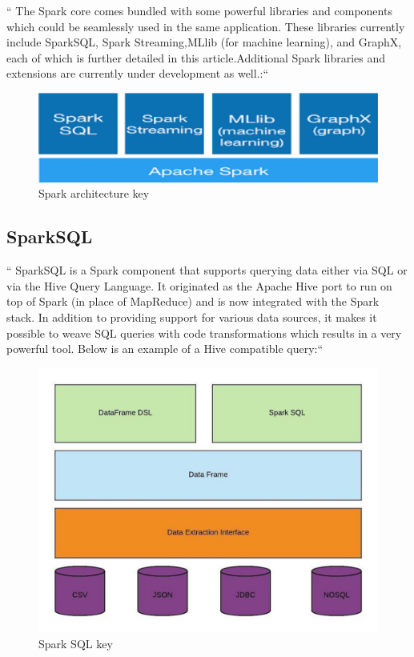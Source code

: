`` The Spark core comes bundled with some powerful libraries and components which could be
seamlessly used in the same application. These libraries currently include SparkSQL,
Spark Streaming,MLlib (for machine learning), and GraphX, each of which is further
detailed in this article.Additional Spark libraries and extensions are currently
under development as well.:``~\cite{hid-sp18-522-topal}


\begin{figure}[!ht]
  \centering\includegraphics[width=\columnwidth]{images/Sparkarchitecture.png} \caption{Spark
  architecture
  key~\cite{hid-sp18-522-sparkarchitecture-image} }\label{f:fig2}
\end{figure}

\subsection{SparkSQL}


`` SparkSQL is a Spark component that supports querying data either via SQL or via the Hive Query
Language. It originated as the Apache Hive port to run on top of Spark (in place of MapReduce)
and is now integrated with the Spark stack. In addition to providing support for various data
sources, it makes it possible to weave SQL queries with code transformations which results in
a very powerful tool. Below is an example of a Hive compatible query:``~\cite{hid-sp18-522-topal}


\begin{figure}[!ht]
  \centering\includegraphics[width=\columnwidth]{images/sparksql.jpeg} \caption{Spark
  SQL
  key~\cite{hid-sp18-522-sparksql-image} }\label{f:fig3}
\end{figure}


